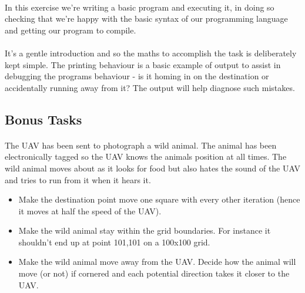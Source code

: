 \documentclass[11pt]{book}
\begin{document}
\paragraph{} In this exercise we're writing a basic program and executing it, in doing so checking that we're happy with the basic syntax of our programming language and getting our program to compile.

\paragraph{} It's a gentle introduction and so the maths to accomplish the task is deliberately kept simple. The printing behaviour is a basic example of output to assist in debugging the programs behaviour - is it homing in on the destination or accidentally running away from it? The output will help diagnose such mistakes.

\subsection{Bonus Tasks}

\paragraph{} The UAV has been sent to photograph a wild animal. The animal has been electronically tagged so the UAV knows the animals position at all times. The wild animal moves about as it looks for food but also hates the sound of the UAV and tries to run from it when it hears it.

\begin{itemize}
\item Make the destination point move one square with every other iteration (hence it moves at half the speed of the UAV).
\item Make the wild animal stay within the grid boundaries. For instance it shouldn't end up at point 101,101 on a 100x100 grid.
\item Make the wild animal move away from the UAV. Decide how the animal will move (or not) if cornered and each potential direction takes it closer to the UAV.
\end{itemize}

\clearpage
\end{document}

